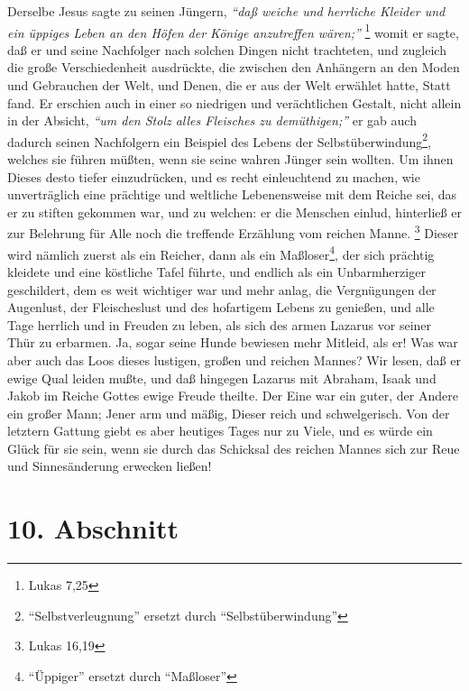 Derselbe Jesus sagte
zu seinen Jüngern, 
\textit{"`daß weiche und herrliche Kleider und ein üppiges Leben an
den Höfen der Könige anzutreffen wären;"'}
\footnote{Lukas 7,25} 
womit er sagte,
daß er und seine Nachfolger nach solchen Dingen nicht trachteten, und zugleich
die große Verschiedenheit ausdrückte, die zwischen den Anhängern an den Moden
und Gebrauchen der Welt, und Denen, die er aus der Welt erwählet hatte, Statt
fand. Er erschien auch in einer so niedrigen und verächtlichen Gestalt, nicht
allein in der Absicht, 
\textit{"`um den Stolz alles Fleisches zu demüthigen;"'} er gab
auch dadurch seinen Nachfolgern ein Beispiel des Lebens der Selbstüberwindung\footnote{"`Selbstverleugnung"' ersetzt durch "`Selbstüberwindung"'},
welches sie führen müßten, wenn sie seine wahren Jünger sein wollten. Um ihnen
Dieses desto tiefer einzudrücken, und es recht einleuchtend zu machen, wie
unverträglich eine prächtige und weltliche Lebenensweise mit dem Reiche sei, das
er zu stiften gekommen war, und zu welchen: er die Menschen einlud, hinterließ
er zur Belehrung für Alle noch die treffende Erzählung vom reichen
Manne.
\footnote{Lukas 16,19} 
Dieser wird nämlich zuerst als ein Reicher, dann als
ein Maßloser\footnote{"`Üppiger"' ersetzt durch "`Maßloser"'}, der sich prächtig kleidete und eine köstliche Tafel führte, und
endlich als ein Unbarmherziger geschildert, dem es weit wichtiger war und mehr
anlag, die Vergnügungen der Augenlust, der Fleischeslust und des hofartigem
Lebens zu genießen, und alle Tage herrlich und in Freuden zu leben, als sich des
armen Lazarus vor seiner Thür zu erbarmen. Ja, sogar seine Hunde bewiesen mehr
Mitleid, als er! Was war aber auch das Loos dieses lustigen, großen und reichen
Mannes? Wir lesen, daß er ewige Qual leiden mußte, und daß hingegen Lazarus mit
Abraham, Isaak und Jakob im Reiche Gottes ewige Freude theilte. Der Eine war ein
guter, der Andere ein großer Mann; Jener arm und mäßig, Dieser reich und
schwelgerisch. Von der letztern Gattung giebt es aber heutiges Tages nur zu
Viele, und es würde ein Glück für sie sein, wenn sie durch das Schicksal des
reichen Mannes sich zur Reue und Sinnesänderung erwecken ließen!

\section{10. Abschnitt} \label{kap14_ab10}

